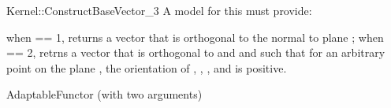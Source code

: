 \begin{ccRefFunctionObjectConcept}{Kernel::ConstructBaseVector_3}
A model for this must provide:


{when  == 1, returns a vector  that is orthogonal to the 
 normal  to plane ; when  == 2, retrns a vector 
  that is orthogonal to  and  and such that
 for an arbitrary point  on the plane , the orientation of
 , , , and  is positive.}

\ccRefines
AdaptableFunctor (with two arguments)

\ccSeeAlso
{}  \\

\end{ccRefFunctionObjectConcept}
